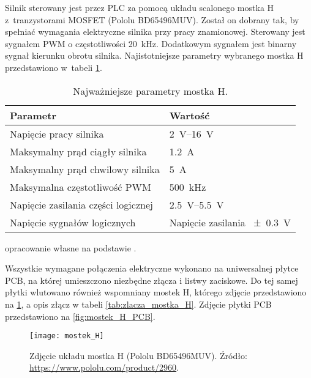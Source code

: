 Silnik sterowany jest przez PLC za pomocą układu scalonego mostka H z~tranzystorami MOSFET (Pololu BD65496MUV). Został on dobrany tak, by spełniać wymagania elektryczne silnika przy pracy znamionowej. Sterowany jest sygnałem PWM o częstotliwości \SI{20}{\kilo\hertz}. Dodatkowym sygnałem jest binarny sygnał kierunku obrotu silnika. Najistotniejsze parametry wybranego mostka H przedstawiono w~tabeli \ref{tab:parametry_mostka_H}.

\begin{table}[H]
    \centering
    \begin{threeparttable}
        \caption{Najważniejsze parametry mostka H.}
        \label{tab:parametry_mostka_H}
        
        \begin{tabular}{l | l}
            \toprule
            Parametr & Wartość \\
            \midrule
            Napięcie pracy silnika & \SIrange{2}{16}{\volt} \\
            Maksymalny prąd ciągły silnika & \SI{1,2}{\ampere} \\
            Maksymalny prąd chwilowy silnika & \SI{5}{\ampere} \\
            Maksymalna częstotliwość PWM & \SI{500}{\kilo\hertz} \\
            Napięcie zasilania części logicznej & \SIrange{2,5}{5,5}{\volt} \\
            Napięcie sygnałów logicznych & Napięcie zasilania \SI{+-0,3}{\volt} \\
            \bottomrule
        \end{tabular}
        
        \begin{tablenotes}
            \footnotesize
            \item[a] opracowanie własne na podstawie \cite{MOSTEK_H_MANUAL}.
        \end{tablenotes}
    \end{threeparttable}
\end{table}

Wszystkie wymagane połączenia elektryczne wykonano na uniwersalnej płytce PCB, na której umieszczono niezbędne złącza i listwy zaciskowe. Do tej samej płytki wlutowano również wspomniany mostek H, którego zdjęcie przedstawiono na \cref{fig:zdjecie_mostka_H}, a opis złącz w tabeli \ref{tab:zlacza_mostka_H}. Zdjęcie płytki PCB przedstawiono na \cref{fig:mostek_H_PCB}.

\begin{figure}[h]
    \centering
    \texttt{[image: mostek\_H]}
    \caption{Zdjęcie układu mostka H (Pololu BD65496MUV). Źródło: \url{https://www.pololu.com/product/2960}.}
    \label{fig:zdjecie_mostka_H}
\end{figure}

